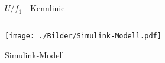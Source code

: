 \chapter{}

\section{}
\begin{figure}[h]
	\centering
	
	\caption{$ U/f_{1} $ - Kennlinie}
	\label{fig:3:UF}
\end{figure}

\section{}
\begin{figure}[h]
	\centering
	\texttt{[image: ./Bilder/Simulink-Modell.pdf]}
	\caption{Simulink-Modell}
	\label{fig:3:simulink}
\end{figure}